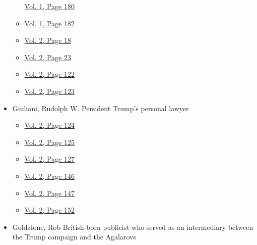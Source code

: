 \begin{itemize}
\begin{itemize}
    \protect\hyperlink{g-page-188}{Vol. 1, Page 180}
  \item
    \protect\hyperlink{g-page-190}{Vol. 1, Page 182}
  \item
    \protect\hyperlink{g-page-230}{Vol. 2, Page 18}
  \item
    \protect\hyperlink{g-page-235}{Vol. 2, Page 23}
  \item
    \protect\hyperlink{g-page-334}{Vol. 2, Page 122}
  \item
    \protect\hyperlink{g-page-335}{Vol. 2, Page 123}
  \end{itemize}
\item
  Giuliani, Rudolph W. Persident Trump's personal lawyer

  \begin{itemize}
  \tightlist
  \item
    \protect\hyperlink{g-page-336}{Vol. 2, Page 124}
  \item
    \protect\hyperlink{g-page-337}{Vol. 2, Page 125}
  \item
    \protect\hyperlink{g-page-339}{Vol. 2, Page 127}
  \item
    \protect\hyperlink{g-page-358}{Vol. 2, Page 146}
  \item
    \protect\hyperlink{g-page-359}{Vol. 2, Page 147}
  \item
    \protect\hyperlink{g-page-364}{Vol. 2, Page 152}
  \end{itemize}
\item
  Goldstone, Rob British-born publicist who served as an intermediary
  between the Trump campaign and the Agalarovs


\end{itemize}
